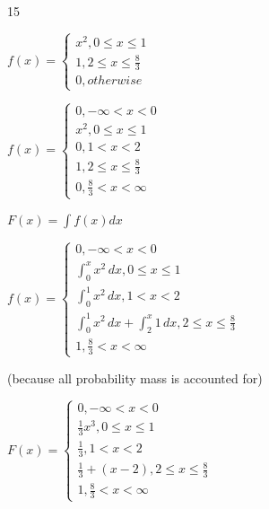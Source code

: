 \documentclass[12 pt]{article}
\begin{document}
    \begin{exercise}{15}
    \hfill

    $f(x) = \begin{cases}
        x^2, 0 \leq x \leq 1 \\
        1, 2 \leq x \leq \frac{8}{3} \\
        0, otherwise
    \end{cases}$

    $f(x) = \begin{cases}
        0, - \infty < x < 0 \\
        x^2, 0 \leq x \leq 1 \\
        0, 1 < x < 2 \\
        1, 2 \leq x \leq \frac{8}{3} \\
        0, \frac{8}{3} < x < \infty
    \end{cases}$

    $F(x) = \int f(x) dx$

    $f(x) = \begin{cases}
        0, - \infty < x < 0 \\
        \int_{0}^{x} x^2 \, dx, 0 \leq x \leq 1 \\
        \int_{0}^{1} x^2 \, dx, 1 < x < 2 \\
        \int_{0}^{1} x^2 \, dx + \int_{2}^{x} 1 \, dx, 2 \leq x \leq \frac{8}{3} \\
        1, \frac{8}{3} < x < \infty
    \end{cases}$ 
    
    (because all probability mass is accounted for)

    $F(x) = \begin{cases}
        0, - \infty < x < 0 \\
        \frac{1}{3} x^3, 0 \leq x \leq 1 \\
        \frac{1}{3}, 1 < x < 2 \\
        \frac{1}{3} + (x - 2), 2 \leq x \leq \frac{8}{3} \\
        1, \frac{8}{3} < x < \infty
    \end{cases}$

    \hfill
    \end{exercise}
\end{document}
